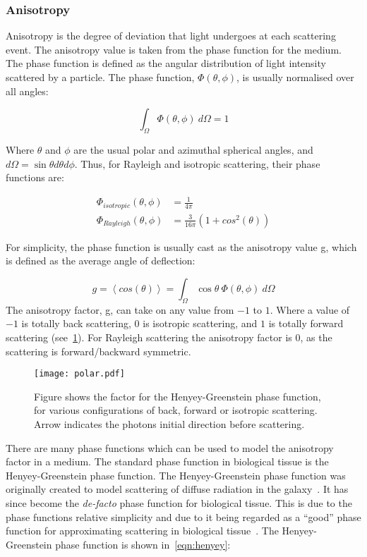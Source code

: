 \subsubsection*{Anisotropy}\label{sec:ansio}

Anisotropy is the degree of deviation that light undergoes at each scattering event. The anisotropy value is taken from the phase function for the medium. The phase function is defined as the angular distribution of light intensity scattered by a particle. The phase function, $\Phi(\theta,\phi)$, is usually normalised over all angles:

\begin{equation}
	\int_{\Omega}\Phi(\theta,\phi)\ d\Omega = 1
\end{equation}

Where $\theta$ and $\phi$ are the usual polar and azimuthal spherical angles, and $d\Omega=\sin\theta d\theta d\phi$.
Thus, for Rayleigh and isotropic scattering, their phase functions are:

\begin{align}
	\Phi_{isotropic}(\theta,\phi)&=\frac{1}{4\pi}\\
	\Phi_{Rayleigh}(\theta,\phi)&=\frac{3}{16\pi}(1+cos^2(\theta))
\end{align}

For simplicity, the phase function is usually cast as the anisotropy value g, which is defined as the average angle of deflection:

\begin{equation}
	g=\left<cos(\theta)\right>=\int_{\Omega}\cos\theta\ \Phi(\theta,\phi)\ d\Omega
\end{equation}
The anisotropy factor, g, can take on any value from $-1$ to $1$. Where a value of $-1$ is totally back scattering, $0$ is isotropic scattering, and $1$ is totally forward scattering (see~\cref{fig:henyey}).
For Rayleigh scattering the anisotropy factor is 0, as the scattering is forward/backward symmetric.

\begin{figure}[!htbp]
	\centering
	\texttt{[image: polar.pdf]}
	\caption{Figure shows the  factor for the Henyey-Greenstein phase function, for various configurations of back, forward or isotropic scattering. Arrow indicates the photons initial direction before scattering.}
	\label{fig:henyey}
\end{figure}
There are many phase functions which can be used to model the anisotropy factor in a medium. The standard phase function in biological tissue is the Henyey-Greenstein phase function. The Henyey-Greenstein phase function was originally created to model scattering of diffuse radiation in the galaxy~\cite{lister2012optical,henyey1941diffuse}. It has since become the \textit{de-facto} phase function for biological tissue. This is due to the phase functions relative simplicity and due to it being regarded as a ``good'' phase function for approximating scattering in biological tissue~\cite{jacques1987angular}.
The Henyey-Greenstein phase function is shown in~\cref{eqn:henyey}:

